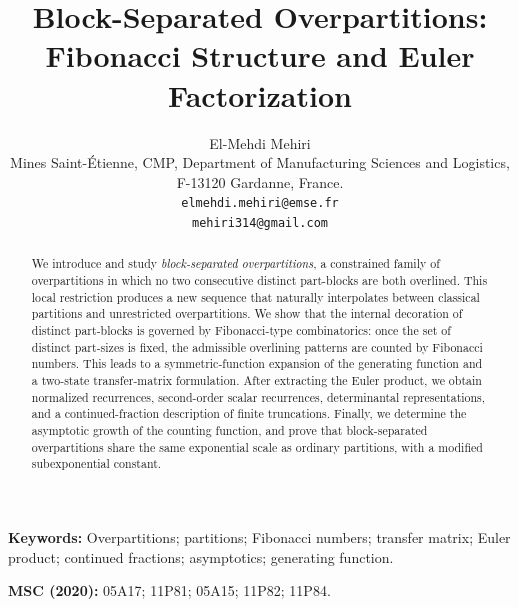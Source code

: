 \documentclass[letterpaper,12pt]{article}
\author{El-Mehdi Mehiri\orcidlink{0000-0002-7164-3658}\\
Mines Saint-Étienne, CMP, Department of Manufacturing Sciences and Logistics, 
F-13120 Gardanne, France.\\ \texttt{elmehdi.mehiri@emse.fr}\\
\texttt{mehiri314@gmail.com}}
\title{\textbf{Block-Separated Overpartitions: Fibonacci Structure and Euler Factorization}}
\date{}
\begin{document}
\maketitle


\begin{abstract}
\noindent We introduce and study \emph{block-separated overpartitions}, a constrained family of overpartitions in which no two consecutive distinct part-blocks are both overlined. This local restriction produces a new sequence that naturally interpolates between classical partitions and unrestricted overpartitions. We show that the internal decoration of distinct part-blocks is governed by Fibonacci-type combinatorics: once the set of distinct part-sizes is fixed, the admissible overlining patterns are counted by Fibonacci numbers. This leads to a symmetric-function expansion of the generating function and a two-state transfer-matrix formulation. After extracting the Euler product, we obtain normalized recurrences, second-order scalar recurrences, determinantal representations, and a continued-fraction description of finite truncations. Finally, we determine the asymptotic growth of the counting function, and prove that block-separated overpartitions share the same exponential scale as ordinary partitions, with a modified subexponential constant.
\end{abstract}

 
\textbf{Keywords:} Overpartitions;  partitions; Fibonacci numbers; transfer matrix; Euler product; continued fractions; asymptotics; generating function.
 
\textbf{MSC (2020):} 05A17; 11P81; 05A15; 11P82; 11P84.


 

 
\end{document}
